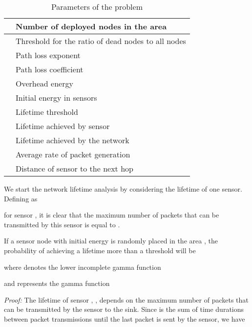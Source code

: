 \documentclass[conference]{IEEEtran}
\begin{document}
\begin{table}[!h]
\begin{center}
\begin{tabular}{|l l|}
\hline

& Number of deployed nodes in the area\\
\hline

& Threshold for the ratio of dead nodes to all nodes\\
\hline

& Path loss exponent\\
\hline

& Path loss coefficient\\
\hline

& Overhead energy\\
\hline

& Initial energy in sensors\\
\hline

 & Lifetime threshold\\
\hline

& Lifetime achieved by sensor \\
\hline

& Lifetime achieved by the network\\
\hline

& Average rate of packet generation\\
\hline
& Distance of sensor  to the next hop\\
\hline
\end{tabular}
\caption{Parameters of the problem} \label{Parameters}
\end{center}
\end{table}
We start the network lifetime analysis by considering the lifetime
of one sensor. Defining  as

for sensor , it is clear that the maximum number of packets that
can be transmitted by this sensor is equal to .

\lem \label{Lemma Sensor lifetime} If a sensor node with initial
energy  is randomly placed in the area , the
probability of achieving a lifetime more than a threshold 
will be

where  denotes the lower incomplete gamma
function

and  represents the gamma function


\textit{Proof:} The lifetime of sensor , , depends on the
maximum number of packets that can be transmitted by the sensor to
the sink. Since  is the sum of time durations between packet
transmissions until the last packet is sent by the sensor, we have
\end{document}
